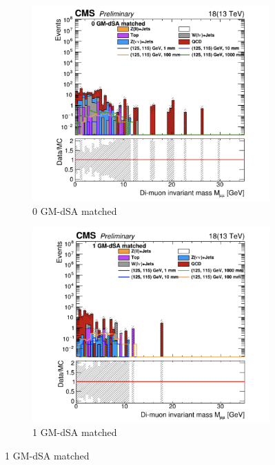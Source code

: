 \documentclass{article}
\begin{document}
\begin{figure}
\begin{subfigure}[b]{.3\textwidth}
  \centering
  \includegraphics[width=\textwidth]{Cut27.png}  
  \caption{0 GM-dSA matched}
  \label{fig:sub-first27}
\end{subfigure}
\begin{subfigure}[b]{.3\textwidth}
  \centering
  \includegraphics[width=\textwidth]{Cut28.png}  
  \caption{1 GM-dSA matched}
  \label{fig:sub-third28}
\end{subfigure}

\end{figure}
\end{document}
